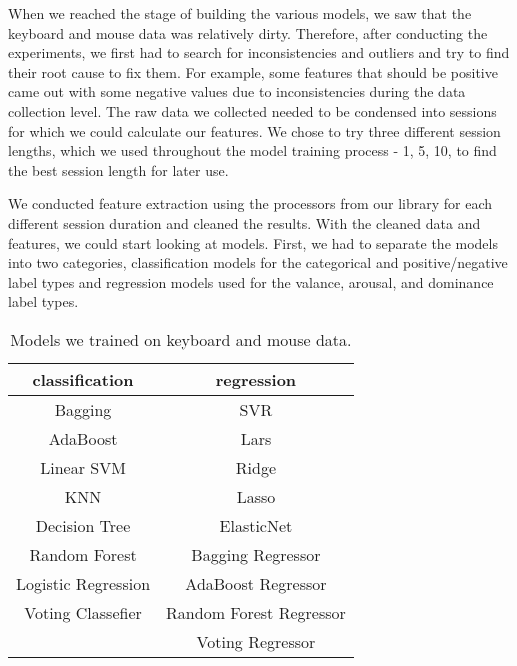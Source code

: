 \documentclass[../main.tex]{subfiles}
\begin{document}
    When we reached the stage of building the various models, we saw that the keyboard and mouse data was relatively dirty. 
    Therefore, after conducting the experiments, we first had to search for inconsistencies and outliers and try to find their root cause to fix them. 
    For example, some features that should be positive came out with some negative values due to inconsistencies during the data collection level.
    The raw data we collected needed to be condensed into sessions for which we could calculate our features. We chose to try three different session lengths, 
    which we used throughout the model training process - 1, 5, 10, to find the best session length for later use.
    
    We conducted feature extraction using the processors from our library for each different session duration and cleaned the results. 
    With the cleaned data and features, we could start looking at models. First, we had to separate the models into two categories, 
    classification models for the categorical and positive/negative label types and regression models used for the valance, arousal, and dominance label types.

    \begin{table}[htp]
        \centering
        \begin{tabular}{cc}
            \toprule
            classification      & regression              \\ \midrule
            Bagging             & SVR                     \\
            AdaBoost            & Lars                    \\
            Linear SVM          & Ridge                   \\
            KNN                 & Lasso                   \\
            Decision Tree       & ElasticNet              \\
            Random Forest       & Bagging Regressor       \\
            Logistic Regression & AdaBoost Regressor      \\
            Voting Classefier   & Random Forest Regressor \\
                                & Voting Regressor        \\ \bottomrule
            \end{tabular}            
            \caption{Models we trained on keyboard and mouse data.}
            \label{table:classic_models}
    \end{table}
\end{document}
